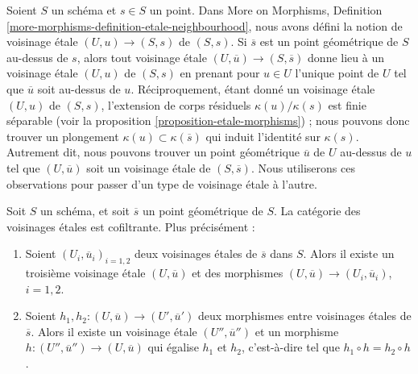 \begin{remark}
\label{remark-etale-neighbourhoods}
Soient $S$ un sch\'ema et $s \in S$ un point. Dans
More on Morphisms,
Definition \ref{more-morphisms-definition-etale-neighbourhood},
nous avons d\'efini la notion de voisinage \'etale $(U, u) \to (S, s)$
de $(S, s)$. Si $\overline{s}$ est un point g\'eom\'etrique de $S$ au-dessus de
$s$, alors tout voisinage \'etale $(U, \overline{u}) \to (S, \overline{s})$
donne lieu \`a un voisinage \'etale $(U, u)$ de $(S, s)$ en prenant pour
$u \in U$ l'unique point de $U$ tel que $\overline{u}$
soit au-dessus de $u$. R\'eciproquement, \'etant donn\'e un voisinage \'etale $(U, u)$
de $(S, s)$, l'extension de corps r\'esiduels $\kappa(u)/\kappa(s)$
est finie s\'eparable (voir la
proposition \ref{proposition-etale-morphisms}) ;
nous pouvons donc trouver un plongement $\kappa(u) \subset \kappa(\overline{s})$
qui induit l'identit\'e sur $\kappa(s)$. Autrement dit, nous pouvons trouver un point g\'eom\'etrique
$\overline{u}$ de $U$ au-dessus de $u$ tel que $(U, \overline{u})$
soit un voisinage \'etale de $(S, \overline{s})$.
Nous utiliserons ces observations pour passer d'un type de
voisinage \'etale \`a l'autre.
\end{remark}

\begin{lemma}
\label{lemma-cofinal-etale}
Soit $S$ un sch\'ema, et soit $\overline{s}$ un point g\'eom\'etrique de $S$.
La cat\'egorie des voisinages \'etales est cofiltrante. Plus pr\'ecis\'ement :
\begin{enumerate}
\item Soient $(U_i, \overline{u}_i)_{i = 1, 2}$ deux voisinages \'etales de
$\overline{s}$ dans $S$. Alors il existe un troisi\`eme voisinage \'etale
$(U, \overline{u})$ et des morphismes
$(U, \overline{u}) \to (U_i, \overline{u}_i)$, $i = 1, 2$.
\item Soient $h_1, h_2: (U, \overline{u}) \to (U', \overline{u}')$ deux
morphismes entre voisinages \'etales de $\overline{s}$. Alors il existe un
voisinage \'etale $(U'', \overline{u}'')$ et un morphisme
$h : (U'', \overline{u}'') \to (U, \overline{u})$
qui \'egalise $h_1$ et $h_2$, c'est-\`a-dire tel que
$h_1 \circ h = h_2 \circ h$.
\end{enumerate}
\end{lemma}

